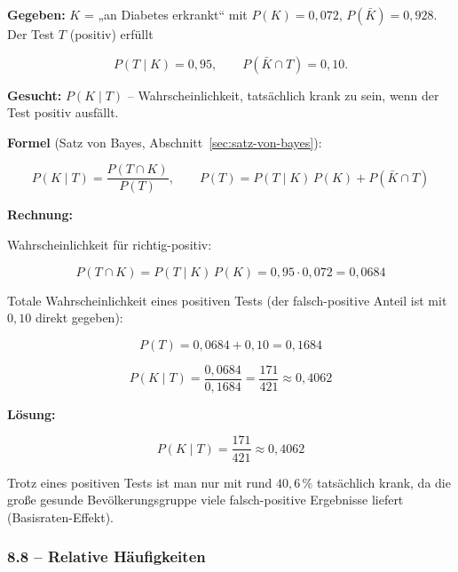 \begin{beispiel}

\textbf{Gegeben:} $K$ = „an Diabetes erkrankt`` mit $P(K) = 0{,}072$,
$P(\bar K) = 0{,}928$. Der Test $T$ (positiv) erfüllt

$$
P(T \mid K) = 0{,}95, \qquad P(\bar K \cap T) = 0{,}10 .
$$

\textbf{Gesucht:} $P(K \mid T)$ -- Wahrscheinlichkeit, tatsächlich krank zu
sein, wenn der Test positiv ausfällt.

\textbf{Formel} (Satz von Bayes, Abschnitt~\ref{sec:satz-von-bayes}):

$$
P(K \mid T) = \frac{P(T \cap K)}{P(T)}, \qquad
P(T) = P(T \mid K)\,P(K) + P(\bar K \cap T)
$$

\textbf{Rechnung:}

Wahrscheinlichkeit für richtig-positiv:

$$
P(T \cap K) = P(T \mid K)\,P(K) = 0{,}95 \cdot 0{,}072 = 0{,}0684
$$

Totale Wahrscheinlichkeit eines positiven Tests (der falsch-positive Anteil ist
mit $0{,}10$ direkt gegeben):

$$
P(T) = 0{,}0684 + 0{,}10 = 0{,}1684
$$

$$
P(K \mid T) = \frac{0{,}0684}{0{,}1684} = \frac{171}{421} \approx 0{,}4062
$$

\textbf{Lösung:}

$$
\boxed{P(K \mid T) = \frac{171}{421} \approx 0{,}4062}
$$

Trotz eines positiven Tests ist man nur mit rund $40{,}6\,\%$ tatsächlich krank,
da die große gesunde Bevölkerungsgruppe viele falsch-positive Ergebnisse liefert
(Basisraten-Effekt).

\end{beispiel}

\subsubsection*{8.8 – Relative Häufigkeiten}

